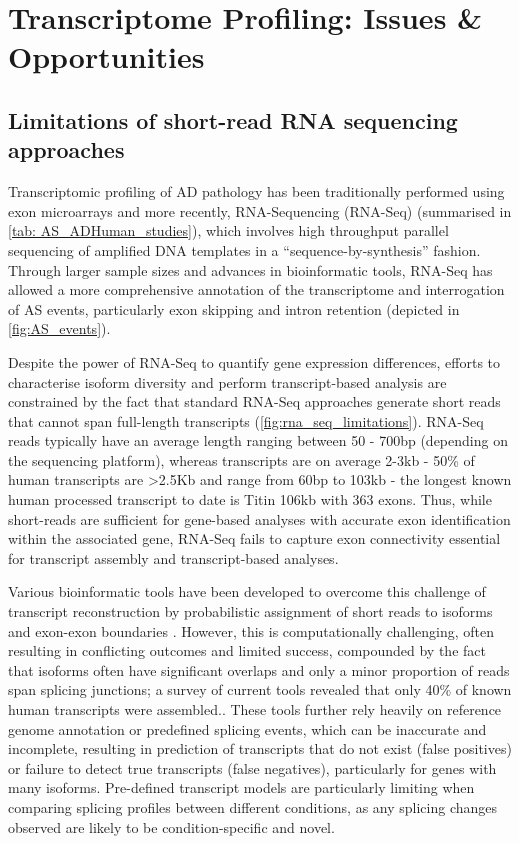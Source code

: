 \section{Transcriptome Profiling: Issues \& Opportunities}
\subsection{Limitations of short-read RNA sequencing approaches}
\label{rnaseq_intro}
Transcriptomic profiling of AD pathology has been traditionally performed using exon microarrays and more recently, RNA-Sequencing (RNA-Seq) (summarised in \cref{tab: AS_ADHuman_studies}), which involves high throughput parallel sequencing of amplified DNA templates in a “sequence-by-synthesis” fashion. Through larger sample sizes and advances in bioinformatic tools, RNA-Seq has allowed a more comprehensive annotation of the transcriptome and interrogation of AS events, particularly exon skipping and intron retention (depicted in \cref{fig:AS_events}). 

Despite the power of RNA-Seq to quantify gene expression differences, efforts to characterise isoform diversity and perform transcript-based analysis are constrained by the fact that standard RNA-Seq approaches generate short reads that cannot span full-length transcripts (\cref{fig:rna_seq_limitations}). RNA-Seq reads typically have an average length ranging between 50 - 700bp (depending on the sequencing platform), whereas transcripts are on average 2-3kb - 50\% of human transcripts are >2.5Kb\cite{Sharon2013} and range from 60bp to 103kb \cite{Piovesan2016,Sharon2013} - the longest known human processed transcript to date is Titin 106kb with 363 exons\cite{Bang2001}. Thus, while short-reads are sufficient for gene-based analyses with accurate exon identification within the associated gene, RNA-Seq fails to capture exon connectivity essential for transcript assembly and transcript-based analyses\cite{Gordon2015}\cite{Wang2016}. 

Various bioinformatic tools have been developed to overcome this challenge of transcript reconstruction by probabilistic assignment of short reads to isoforms and exon-exon boundaries \cite{Trapnell2010, Kingsford2010, Au2013}. However, this is computationally challenging, often resulting in conflicting outcomes and limited success\cite{Steijger2013}, compounded by the fact that isoforms often have significant overlaps and only a minor proportion of reads span splicing junctions; a survey of current tools revealed that only 40\% of known human transcripts were assembled\cite{Steijger2013}.. These tools further rely heavily on reference genome annotation or predefined splicing events, which can be inaccurate and incomplete, resulting in prediction of transcripts that do not exist (false positives) or failure to detect true transcripts (false negatives), particularly for genes with many isoforms\cite{Au2013}. Pre-defined transcript models are particularly limiting when comparing splicing profiles between different conditions, as any splicing changes observed are likely to be condition-specific and novel. 

